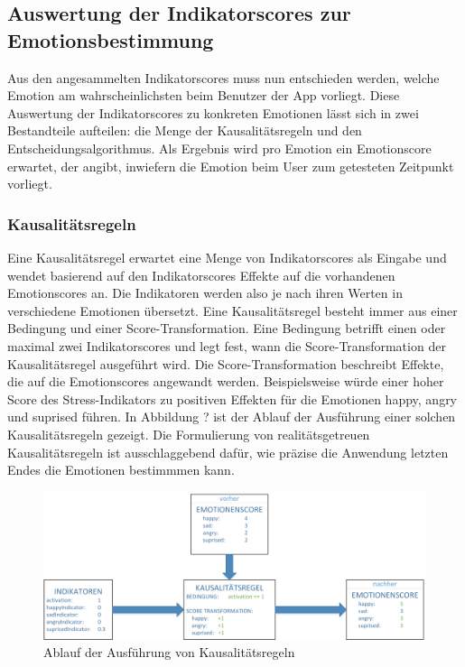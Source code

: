 \subsection{Auswertung der Indikatorscores zur Emotionsbestimmung}
Aus den angesammelten Indikatorscores muss nun entschieden werden, welche Emotion am wahrscheinlichsten beim Benutzer der App vorliegt. Diese Auswertung der Indikatorscores zu konkreten Emotionen lässt sich in zwei Bestandteile aufteilen: die Menge der Kausalitätsregeln und den Entscheidungsalgorithmus. Als Ergebnis wird pro Emotion ein Emotionscore erwartet, der angibt, inwiefern die Emotion beim User zum getesteten Zeitpunkt vorliegt.
\subsubsection{Kausalitätsregeln}
Eine Kausalitätsregel erwartet eine Menge von Indikatorscores als Eingabe und wendet basierend auf den Indikatorscores Effekte auf die vorhandenen Emotionscores an. Die Indikatoren werden also je nach ihren Werten in verschiedene Emotionen übersetzt. \newline Eine Kausalitätsregel besteht immer aus einer Bedingung und einer Score-Transformation. Eine Bedingung betrifft einen oder maximal zwei Indikatorscores und legt fest, wann die Score-Transformation der Kausalitätsregel ausgeführt wird. Die Score-Transformation beschreibt Effekte, die auf die Emotionscores angewandt werden. Beispielsweise würde einer hoher Score des Stress-Indikators zu positiven Effekten für die Emotionen happy, angry und suprised führen. In Abbildung ? ist der Ablauf der Ausführung einer solchen Kausalitätsregeln gezeigt. Die Formulierung von realitätsgetreuen Kausalitätsregeln ist ausschlaggebend dafür, wie präzise die Anwendung letzten Endes die Emotionen bestimmmen kann. \newline
\begin{figure}[h]
	\centering
	\includegraphics[width=16cm]{Bilder/causalityrules.png}
	\caption[Ablauf der Ausführung von Kausalitätsregeln]{Ablauf der Ausführung von Kausalitätsregeln}
\end{figure}%
